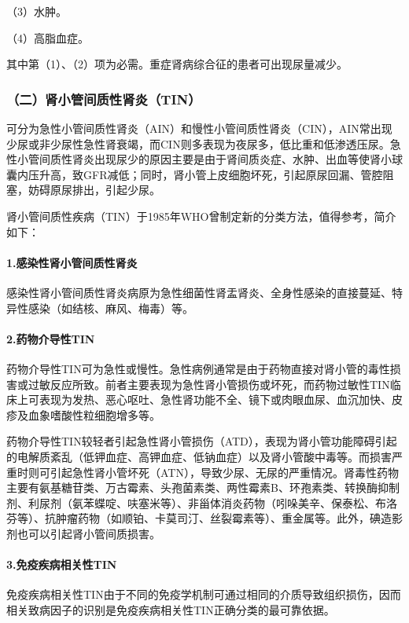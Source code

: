 （3）水肿。

（4）高脂血症。

其中第（1）、（2）项为必需。重症肾病综合征的患者可出现尿量减少。

\subsubsection{（二）肾小管间质性肾炎（TIN）}

可分为急性小管间质性肾炎（AIN）和慢性小管间质性肾炎（CIN），AIN常出现少尿或非少尿性急性肾衰竭，而CIN则多表现为夜尿多，低比重和低渗透压尿。急性小管间质性肾炎出现尿少的原因主要是由于肾间质炎症、水肿、出血等使肾小球囊内压升高，致GFR减低；同时，肾小管上皮细胞坏死，引起原尿回漏、管腔阻塞，妨碍原尿排出，引起少尿。

肾小管间质性疾病（TIN）于1985年WHO曾制定新的分类方法，值得参考，简介如下：

\paragraph{1.感染性肾小管间质性肾炎}

感染性肾小管间质性肾炎病原为急性细菌性肾盂肾炎、全身性感染的直接蔓延、特异性感染（如结核、麻风、梅毒）等。

\paragraph{2.药物介导性TIN}

药物介导性TIN可为急性或慢性。急性病例通常是由于药物直接对肾小管的毒性损害或过敏反应所致。前者主要表现为急性肾小管损伤或坏死，而药物过敏性TIN临床上可表现为发热、恶心呕吐、急性肾功能不全、镜下或肉眼血尿、血沉加快、皮疹及血象嗜酸性粒细胞增多等。

药物介导性TIN较轻者引起急性肾小管损伤（ATD），表现为肾小管功能障碍引起的电解质紊乱（低钾血症、高钾血症、低钠血症）以及肾小管酸中毒等。而损害严重时则可引起急性肾小管坏死（ATN），导致少尿、无尿的严重情况。肾毒性药物主要有氨基糖苷类、万古霉素、头孢菌素类、两性霉素B、环孢素类、转换酶抑制剂、利尿剂（氨苯蝶啶、呋塞米等）、非甾体消炎药物（吲哚美辛、保泰松、布洛芬等）、抗肿瘤药物（如顺铂、卡莫司汀、丝裂霉素等）、重金属等。此外，碘造影剂也可以引起肾小管间质损害。

\paragraph{3.免疫疾病相关性TIN}

免疫疾病相关性TIN由于不同的免疫学机制可通过相同的介质导致组织损伤，因而相关致病因子的识别是免疫疾病相关性TIN正确分类的最可靠依据。

